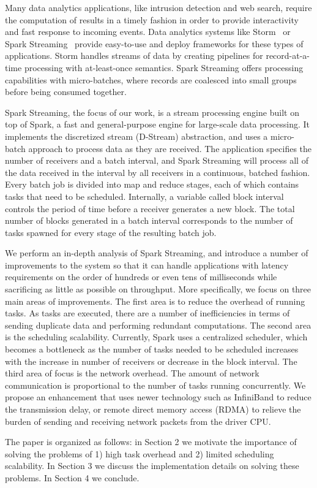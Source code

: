 \noindent

Many data analytics applications, like intrusion detection and web search, require the computation of results in a timely fashion in order to provide interactivity and fast response to incoming events.
Data analytics systems like Storm~\cite{Storm} or Spark Streaming~\cite{SparkStreaming} provide easy-to-use and deploy frameworks for these types of applications. Storm handles streams of data by creating pipelines for record-at-a-time processing with at-least-once semantics. Spark Streaming offers processing capabilities with micro-batches, where records are coalesced into small groups before being consumed together.

Spark Streaming, the focus of our work, is a stream processing engine built on top of Spark, a fast and general-purpose engine for large-scale data processing. It implements the discretized stream (D-Stream) abstraction, and uses a micro-batch approach to process data as they are received. The application specifies the number of receivers and a batch interval, and Spark Streaming will process all of the data received in the interval by all receivers in a continuous, batched fashion. Every batch job is divided into map and reduce stages, each of which contains tasks that need to be scheduled. Internally, a variable called block interval controls the period of time before a receiver generates a new block. The total number of blocks generated in a batch interval corresponds to the number of tasks spawned for every stage of the resulting batch job.

We perform an in-depth analysis of Spark Streaming, and introduce a number of improvements to the system so that it can handle applications with latency requirements on the order of hundreds or even tens of milliseconds while sacrificing as little as possible on throughput. More specifically, we focus on three main areas of improvements. The first area is to reduce the overhead of running tasks. As tasks are executed, there are a number of inefficiencies in terms of sending duplicate data and performing redundant computations. The second area is the scheduling scalability. Currently, Spark uses a centralized scheduler, which becomes a bottleneck as the number of tasks needed to be scheduled increases with the increase in number of receivers or decrease in the block interval. The third area of focus is the network overhead. The amount of network communication is proportional to the number of tasks running concurrently. We propose an enhancement that uses newer technology such as InfiniBand to reduce the transmission delay, or remote direct memory access (RDMA) to relieve the burden of sending and receiving network packets from the driver CPU.

The paper is organized as follows: in Section 2 we motivate the importance of solving the problems of 1) high task overhead and 2) limited scheduling scalability. In Section 3 we discuss the implementation details on solving these problems. In Section 4 we conclude.

